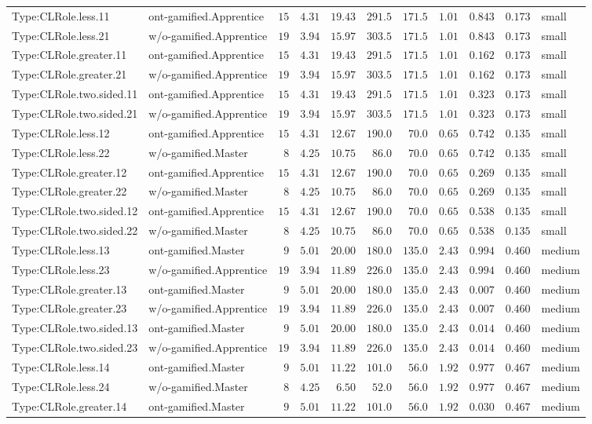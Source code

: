 \documentclass[6pt,a4paper]{article}
\begin{document}
{\begin{longtable}{llrrrrrrrrl}
Type:CLRole.less.11&ont-gamified.Apprentice&$15$&$4.31$&$19.43$&$291.5$&$171.5$&$ 1.01$&$0.843$&$0.173$&small\tabularnewline
Type:CLRole.less.21&w/o-gamified.Apprentice&$19$&$3.94$&$15.97$&$303.5$&$171.5$&$ 1.01$&$0.843$&$0.173$&small\tabularnewline
Type:CLRole.greater.11&ont-gamified.Apprentice&$15$&$4.31$&$19.43$&$291.5$&$171.5$&$ 1.01$&$0.162$&$0.173$&small\tabularnewline
Type:CLRole.greater.21&w/o-gamified.Apprentice&$19$&$3.94$&$15.97$&$303.5$&$171.5$&$ 1.01$&$0.162$&$0.173$&small\tabularnewline
Type:CLRole.two.sided.11&ont-gamified.Apprentice&$15$&$4.31$&$19.43$&$291.5$&$171.5$&$ 1.01$&$0.323$&$0.173$&small\tabularnewline
Type:CLRole.two.sided.21&w/o-gamified.Apprentice&$19$&$3.94$&$15.97$&$303.5$&$171.5$&$ 1.01$&$0.323$&$0.173$&small\tabularnewline
Type:CLRole.less.12&ont-gamified.Apprentice&$15$&$4.31$&$12.67$&$190.0$&$ 70.0$&$ 0.65$&$0.742$&$0.135$&small\tabularnewline
Type:CLRole.less.22&w/o-gamified.Master&$ 8$&$4.25$&$10.75$&$ 86.0$&$ 70.0$&$ 0.65$&$0.742$&$0.135$&small\tabularnewline
Type:CLRole.greater.12&ont-gamified.Apprentice&$15$&$4.31$&$12.67$&$190.0$&$ 70.0$&$ 0.65$&$0.269$&$0.135$&small\tabularnewline
Type:CLRole.greater.22&w/o-gamified.Master&$ 8$&$4.25$&$10.75$&$ 86.0$&$ 70.0$&$ 0.65$&$0.269$&$0.135$&small\tabularnewline
Type:CLRole.two.sided.12&ont-gamified.Apprentice&$15$&$4.31$&$12.67$&$190.0$&$ 70.0$&$ 0.65$&$0.538$&$0.135$&small\tabularnewline
Type:CLRole.two.sided.22&w/o-gamified.Master&$ 8$&$4.25$&$10.75$&$ 86.0$&$ 70.0$&$ 0.65$&$0.538$&$0.135$&small\tabularnewline
Type:CLRole.less.13&ont-gamified.Master&$ 9$&$5.01$&$20.00$&$180.0$&$135.0$&$ 2.43$&$0.994$&$0.460$&medium\tabularnewline
Type:CLRole.less.23&w/o-gamified.Apprentice&$19$&$3.94$&$11.89$&$226.0$&$135.0$&$ 2.43$&$0.994$&$0.460$&medium\tabularnewline
Type:CLRole.greater.13&ont-gamified.Master&$ 9$&$5.01$&$20.00$&$180.0$&$135.0$&$ 2.43$&$0.007$&$0.460$&medium\tabularnewline
Type:CLRole.greater.23&w/o-gamified.Apprentice&$19$&$3.94$&$11.89$&$226.0$&$135.0$&$ 2.43$&$0.007$&$0.460$&medium\tabularnewline
Type:CLRole.two.sided.13&ont-gamified.Master&$ 9$&$5.01$&$20.00$&$180.0$&$135.0$&$ 2.43$&$0.014$&$0.460$&medium\tabularnewline
Type:CLRole.two.sided.23&w/o-gamified.Apprentice&$19$&$3.94$&$11.89$&$226.0$&$135.0$&$ 2.43$&$0.014$&$0.460$&medium\tabularnewline
Type:CLRole.less.14&ont-gamified.Master&$ 9$&$5.01$&$11.22$&$101.0$&$ 56.0$&$ 1.92$&$0.977$&$0.467$&medium\tabularnewline
Type:CLRole.less.24&w/o-gamified.Master&$ 8$&$4.25$&$ 6.50$&$ 52.0$&$ 56.0$&$ 1.92$&$0.977$&$0.467$&medium\tabularnewline
Type:CLRole.greater.14&ont-gamified.Master&$ 9$&$5.01$&$11.22$&$101.0$&$ 56.0$&$ 1.92$&$0.030$&$0.467$&medium\tabularnewline

\end{longtable}}
\end{document}
